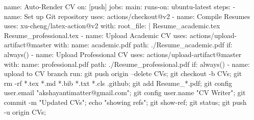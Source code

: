 name: Auto-Render CV
on:	[push]
jobs:
  main:
    runs-on: ubuntu-latest
    steps:
      - name: Set up Git repository
        uses: actions/checkout@v2
      - name: Compile Resumes
        uses: xu-cheng/latex-action@v2
        with:
          root_file: |
            Resume_academic.tex
            Resume_professional.tex
      - name: Upload Academic CV
        uses: actions/upload-artifact@master
        with:
          name: academic.pdf
          path: ./Resume_academic.pdf
        if: always()
      - name: Upload Professional CV
        uses: actions/upload-artifact@master
        with:
          name: professional.pdf
          path: ./Resume_professional.pdf
        if: always()
      - name: upload to CV branch
        run: git push origin --delete CVs; git checkout -b CVs; git rm -rf *.tex *.md *.bib *.txt *.cls .github; git add Resume_*.pdf; git config user.email "akshayantimatter@gmail.com"; git config user.name "CV Writer"; git commit -m "Updated CVs"; echo "showing refs"; git show-ref; git status; git push -u origin CVs;
